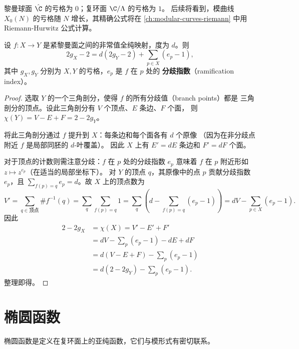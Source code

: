 \begin{remark}
黎曼球面 $\hat{\C}$ 的亏格为 $0$；复环面 $\C/\Lambda$ 的亏格为 $1$。
后续将看到，模曲线 $X_0(N)$ 的亏格随 $N$ 增长，其精确公式将在
\cref{ch:modular-curves-riemann} 中用 Riemann-Hurwitz 公式计算。
\end{remark}

\begin{theorem}
\label{thm:riemann-hurwitz}
设 $f\colon X \to Y$ 是紧黎曼面之间的非常值全纯映射，度为 $d$。则
\[
  2g_X - 2 = d(2g_Y - 2) + \sum_{p \in X} (e_p - 1),
\]
其中 $g_X, g_Y$ 分别为 $X, Y$ 的亏格，$e_p$ 是 $f$ 在 $p$ 处的
\textbf{分歧指数}（ramification index）。
\end{theorem}

\begin{proof}
选取 $Y$ 的一个三角剖分，使得 $f$ 的所有分歧值（branch points）都是
三角剖分的顶点。设此三角剖分有 $V$ 个顶点、$E$ 条边、$F$ 个面，
则 $\chi(Y) = V - E + F = 2 - 2g_Y$。

将此三角剖分通过 $f$ 提升到 $X$：每条边和每个面各有 $d$ 个原像
（因为在非分歧点附近 $f$ 是局部同胚的 $d$-叶覆盖）。
因此 $X$ 上有 $E' = dE$ 条边和 $F' = dF$ 个面。

对于顶点的计数则需注意分歧：$f$ 在 $p$ 处的分歧指数 $e_p$ 意味着
$f$ 在 $p$ 附近形如 $z \mapsto z^{e_p}$（在适当的局部坐标下）。
对 $Y$ 的顶点 $q$，其原像中的点 $p$ 贡献分歧指数 $e_p$，且
$\sum_{f(p)=q} e_p = d$。故 $X$ 上的顶点数为
\[
  V' = \sum_{q \in \text{顶点}} \#f^{-1}(q)
  = \sum_q \sum_{f(p)=q} 1
  = \sum_q \left(d - \sum_{f(p)=q}(e_p - 1)\right)
  = dV - \sum_{p \in X}(e_p - 1).
\]
因此
\begin{align}
  2 - 2g_X &= \chi(X) = V' - E' + F' \\
  &= dV - \sum_p(e_p - 1) - dE + dF \\
  &= d(V - E + F) - \sum_p(e_p - 1) \\
  &= d(2 - 2g_Y) - \sum_p(e_p - 1).
\end{align}
整理即得。
\end{proof}


\section{椭圆函数}
\label{sec:elliptic-functions}

椭圆函数是定义在复环面上的亚纯函数，它们与模形式有密切联系。

